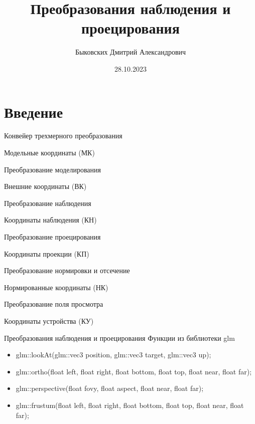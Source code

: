 \documentclass{beamer}
\title[Наблюдение и проецирование]{Преобразования наблюдения и проецирования}
\author[Быковских Д.А.]{Быковских Дмитрий Александрович}
\date{28.10.2023}
\begin{document}
	\begin{frame}
		\titlepage
	\end{frame}

	\section{Введение}

	\begin{frame}{Конвейер трехмерного преобразования}
		
		{\hfill
		Модельные координаты (МК)
		}
		
		Преобразование моделирования
		
		{\hfill
		Внешние координаты (ВК)
		}

		Преобразование наблюдения

		{\hfill
		Координаты наблюдения (КН)
		}

		Преобразование проецирования
		
		{\hfill
		Координаты проекции (КП)
		}
		
		Преобразование нормировки и отсечение
		
		{\hfill
		Нормированные координаты (НК)
		}

		Преобразование поля просмотра
		
		{\hfill
		Координаты устройства (КУ)
		}				
	\end{frame}

	\begin{frame}{Преобразования наблюдения и проецирования}
		Функции из библиотеки glm
		\begin{itemize}
			\item glm::lookAt(glm::vec3 position, glm::vec3 target, glm::vec3 up);
			\item glm::ortho(float left, float right, float bottom, float top, float near, float far);
			\item glm::perspective(float fovy, float aspect, float near, float far);
			\item glm::frustum(float left, float right, float bottom, float top, float near, float far);
		\end{itemize}
	\end{frame}
\end{document}
